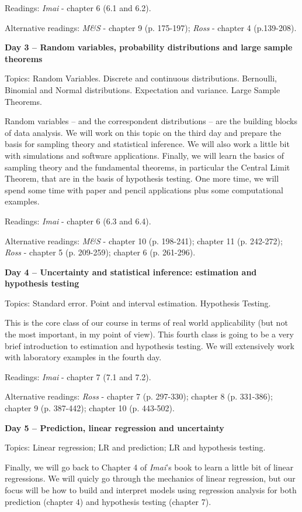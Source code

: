 \documentclass[a4paper,11pt]{article}
\begin{document}
Readings: \emph{Imai} - chapter 6 (6.1 and 6.2).

Alternative readings: \emph{M\&S} - chapter 9 (p. 175-197); \emph{Ross} - chapter 4 (p.139-208).

\textbf{Day 3 -- Random variables, probability distributions and large sample theorems}

Topics: Random Variables. Discrete and continuous distributions. Bernoulli, Binomial and Normal distributions. Expectation and variance. Large Sample Theorems.

Random variables -- and the correspondent distributions -- are the building blocks of data analysis. We will work on this topic on the third day and prepare the basis for sampling theory and statistical inference. We will also work a little bit with simulations and software applications. Finally, we will learn the basics of sampling theory and the fundamental theorems, in particular the Central Limit Theorem, that are in the basis of hypothesis testing. One more time, we will spend some time with paper and pencil applications plus some computational examples.

Readings: \emph{Imai} - chapter 6 (6.3 and 6.4).

Alternative readings: \emph{M\&S} - chapter 10 (p. 198-241); chapter 11 (p. 242-272); \emph{Ross} - chapter 5 (p. 209-259); chapter 6 (p. 261-296).

\textbf{Day 4 -- Uncertainty and statistical inference: estimation and hypothesis testing}

Topics: Standard error. Point and interval estimation. Hypothesis Testing.

This is the core class of our course in terms of real world applicability (but not the most important, in my point of view). This fourth class is going to be a very brief introduction to estimation and hypothesis testing. We will extensively work with laboratory examples in the fourth day.

Readings: \emph{Imai} - chapter 7 (7.1 and 7.2).

Alternative readings: \emph{Ross} - chapter 7 (p. 297-330); chapter 8 (p. 331-386); chapter 9 (p. 387-442); chapter 10 (p. 443-502).

\textbf{Day 5 -- Prediction, linear regression and uncertainty}

Topics: Linear regression; LR and prediction; LR and hypothesis testing.

Finally, we will go back to Chapter 4 of \emph{Imai}'s book to learn a little bit of linear regressions. We will quicly go through the mechanics of linear regression, but our focus will be how to build and interpret models using regression analysis for both prediction (chapter 4) and hypothesis testing (chapter 7). 
\end{document}
